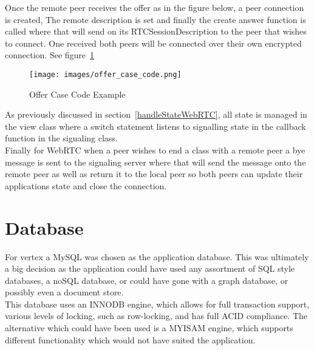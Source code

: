 Once the remote peer receives the offer as in the figure below, a peer connection is created,
The remote description is set and finally the create answer function is called where that will send on its RTCSessionDescription to the peer that wishes to connect. One received both peers will be connected over their own encrypted connection. See figure~\ref{image:offerCaseCode}
\begin{figure}[h!]
    \caption{Offer Case Code Example}
    \label{image:offerCaseCode}
    \centering
    \texttt{[image: images/offer\_case\_code.png]}
\end{figure}

As previously discussed in  section~\ref{handleStateWebRTC}, all state is managed in the view class where a switch statement listens to signalling state in the callback function in the signaling class.
\\ Finally for WebRTC when a peer wishes to end a class with a remote peer a bye message is sent to the signaling server where that will send the message onto the remote peer as well as return it to the local peer so both peers can update their applications state and close the connection.  


\section{Database}
For vertex a MySQL was chosen as the application database. This was ultimately a big decision as the application could have used any assortment of SQL style databases, a noSQL database, or could have gone with a graph database, or possibly even a document store.
\\ This database uses an INNODB engine, which allows for full transaction support, various levels of locking, such as row-locking, and has full ACID compliance. The alternative which could have been used is a MYISAM engine, which supports different functionality which would not have suited the application.

